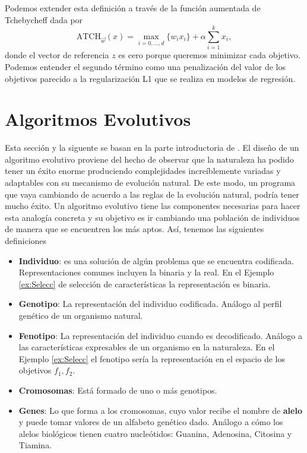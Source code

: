 Podemos extender esta definición a través de la función aumentada de Tchebycheff \cite{TCHEB} dada por
\begin{equation} \label{eq:tchebychev}
    \text{ATCH}_{\vec{w}}(x)=\max_{i=0,\ldots,d} \{w_ix_i\}+\alpha \sum_{i=1}^k x_i   ,
\end{equation}
donde el vector de referencia $z$  es cero porque queremos minimizar cada objetivo. Podemos entender el segundo término como una penalización del valor de los objetivos parecido a la regularización L1 que se realiza en modelos de regresión.


\section{Algoritmos Evolutivos} \label{sec:AE}

Esta sección y la siguente se basan en la parte introductoria de \cite{EAforMOEAs}. El diseño de un algoritmo evolutivo proviene del hecho de observar  que la naturaleza ha podido tener un éxito enorme produciendo complejidades increíblemente variadas y adaptables con su mecanismo de evolución natural. De este modo, un programa que vaya cambiando de acuerdo a las reglas de la evolución natural, podría tener mucho éxito. Un algoritmo evolutivo tiene las componentes necesarias para hacer esta analogía concreta y su objetivo es ir cambiando una población de individuos de manera que se encuentren los más aptos. Así, tenemos las siguientes definiciones

\begin{itemize}
    \item \textbf{Individuo}: es una solución de algún problema que se encuentra codificada. Representaciones comunes incluyen la binaria y la real. En el Ejemplo \ref{ex:Selecc} de selección de características  la representación es binaria.
    \item \textbf{Genotipo}: La representación del individuo codificada. Análogo al perfil genético de un organismo natural. 
    \item \textbf{Fenotipo}: La representación del individuo cuando es decodificado. Análogo a las características expresables de un organismo en la naturaleza. En el Ejemplo \ref{ex:Selecc} el fenotipo sería la representación en el espacio de los objetivos $f_1, f_2$.
    \item \textbf{Cromosomas}: Está formado de uno o más genotipos.
    \item \textbf{Genes}: Lo que forma a los cromosomas, cuyo valor recibe el nombre de \textbf{alelo} y puede tomar valores de un alfabeto genético dado. Análogo a cómo los alelos biológicos tienen cuatro nucleótidos: Guanina, Adenosina, Citosina y Tiamina. 
\end{itemize}

